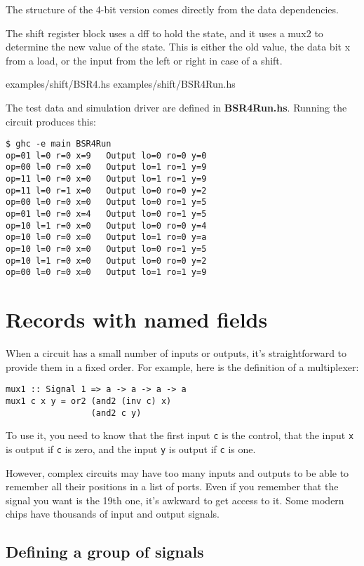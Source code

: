 \documentclass[11pt]{article}
\begin{document}
The structure of the 4-bit version comes directly from the data
dependencies.

The shift register block uses a dff to hold the state, and it uses a
mux2 to determine the new value of the state.  This is either the old
value, the data bit x from a load, or the input from the left or right
in case of a shift.

examples/shift/BSR4.hs
examples/shift/BSR4Run.hs

The test data and simulation driver are defined in \textbf{BSR4Run.hs}.
Running the circuit produces this:


\begin{verbatim}
$ ghc -e main BSR4Run
op=01 l=0 r=0 x=9   Output lo=0 ro=0 y=0
op=00 l=0 r=0 x=0   Output lo=1 ro=1 y=9
op=11 l=0 r=0 x=0   Output lo=1 ro=1 y=9
op=11 l=0 r=1 x=0   Output lo=0 ro=0 y=2
op=00 l=0 r=0 x=0   Output lo=0 ro=1 y=5
op=01 l=0 r=0 x=4   Output lo=0 ro=1 y=5
op=10 l=1 r=0 x=0   Output lo=0 ro=0 y=4
op=10 l=0 r=0 x=0   Output lo=1 ro=0 y=a
op=10 l=0 r=0 x=0   Output lo=0 ro=1 y=5
op=10 l=1 r=0 x=0   Output lo=0 ro=0 y=2
op=00 l=0 r=0 x=0   Output lo=1 ro=1 y=9
\end{verbatim}


\section{Records with named fields}
\label{sec:org463e7f6}

When a circuit has a small number of inputs or outputs, it's
straightforward to provide them in a fixed order.  For example, here
is the definition of a multiplexer:

\begin{verbatim}
mux1 :: Signal 1 => a -> a -> a -> a
mux1 c x y = or2 (and2 (inv c) x)
                 (and2 c y)
\end{verbatim}

To use it, you need to know that the first input \texttt{c} is the control,
that the input \texttt{x} is output if \texttt{c} is zero, and the input \texttt{y} is
output if \texttt{c} is one.

However, complex circuits may have too many inputs and outputs to be
able to remember all their positions in a list of ports.  Even if
you remember that the signal you want is the 19th one, it's awkward
to get access to it.  Some modern chips have thousands of input and
output signals.

\subsection{Defining a group of signals}
\label{sec:org55655fa}
\end{document}
